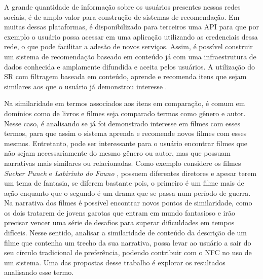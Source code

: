 A grande quantidade de informação sobre os usuários presentes nessas redes sociais, é de amplo valor para construção de sistemas de recomendação. Em muitas dessas plataformas, é disponibilizado para terceiros uma \ac{API} para que por exemplo o usuário possa acessar em uma aplicação utilizando as credenciais dessa rede, o que pode facilitar a adesão de novos serviços. Assim, é possível construir um sistema de recomendação baseado em conteúdo já com uma infraestrutura de dados conhecida e amplamente difundida e aceita pelos usuários. A utilização do \ac{SR} com filtragem baseada em conteúdo, aprende e recomenda itens que sejam similares aos que o usuário já demonstrou interesse \citep{Ricci2011}.

Na similaridade em termos associados aos itens em comparação, é comum em domínios como de livros e filmes seja comparado termos como gênero e autor. Nesse caso, é analisando se já foi demonstrado interesse em filmes com esses termos, para que assim o sistema aprenda e recomende novos filmes com esses mesmos. Entretanto, pode ser interessante para o usuário encontrar filmes que não sejam necessariamente do mesmo gênero ou autor, mas que possuam narrativas mais similares ou relacionadas. Como exemplo considere os filmes \textit{Sucker Punch} \citep{SuckerPunch2011} e \textit{Labirinto do Fauno} \citep{LaberintoFauno2006}, possuem diferentes diretores e apesar terem um tema de fantasia, se diferem bastante pois, o primeiro é um filme mais de ação enquanto que o segundo é um drama que se passa num período de guerra. Na narrativa dos filmes é possível encontrar novos pontos de similaridade, como os dois tratarem de jovens garotas que entram em mundo fantasioso e irão precisar vencer uma série de desafios para superar dificuldades em tempos difíceis. Nesse sentido, analisar a similaridade de conteúdo da descrição de um filme que contenha um trecho da sua narrativa, possa levar ao usuário a sair do seu círculo tradicional de preferência, podendo contribuir com o NFC no uso de um sistema. Uma das propostas desse trabalho é explorar os resultados analisando esse termo.

